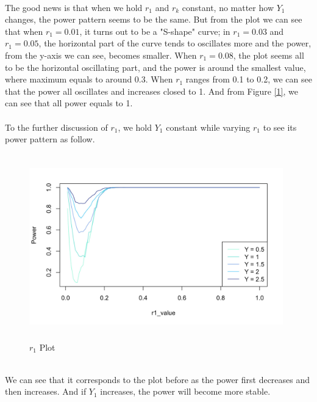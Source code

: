 \documentclass[10pt,english]{article}\usepackage{graphicx, color}
\numberwithin{equation}{section}
\numberwithin{figure}{section}
\begin{document}
\quad\\
The good news is that when we hold $r_1$ and $r_k$ constant, no matter how $Y_1$ changes, the power pattern seems to be the same. But from the plot we can see that when $r_1=0.01$, it turns out to be a "S-shape" curve; in $r_1=0.03$ and $r_1=0.05$, the horizontal part of the curve tends to oscillates more and the power, from the y-axis we can see, becomes smaller. When $r_1=0.08$, the plot seems all to be the horizontal oscillating part, and the power is around the smallest value, where maximum equals to around 0.3. When $r_1$ ranges from 0.1 to 0.2, we can see that the power all oscillates and increases closed to 1. And from Figure \ref{1}, we can see that all power equals to 1.\\
\quad\\
To the further discussion of $r_1$, we hold $Y_1$ constant while varying $r_1$ to see its power pattern as follow.\\
\begin{figure}[htbp]
\centering\includegraphics[width=11cm,height=8cm]{r1}
\caption{$r_1$ Plot}
\end{figure}
\quad\\
We can see that it corresponds to the plot before as the power first decreases and then increases. And if $Y_1$ increases, the power will become more stable.
\end{document}

